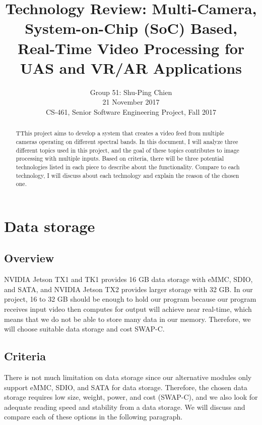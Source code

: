 \documentclass[letterpaper,10pt,serif,draftclsnofoot,onecolumn,compsoc,titlepage]{IEEEtran}
\title{Technology Review: Multi-Camera, System-on-Chip (SoC) Based, Real-Time Video Processing for UAS and VR/AR Applications}
\author{Group 51: Shu-Ping Chien \\ 21 November 2017 \\ CS-461, Senior Software Engineering Project, Fall 2017}
\begin{document}
\begin{titlepage}
\maketitle
\begin{abstract}

TThis project aims to develop a system that creates a video feed from multiple cameras operating on 
different spectral bands. In this document, I will analyze three different topics used in this project, 
and the goal of these topics contributes to image processing with multiple inputs. Based on criteria, 
there will be three potential technologies listed in each piece to describe about the functionality. 
Compare to each technology, I will discuss about each technology and explain the reason of the chosen one.


\end{abstract}
\end{titlepage}
\newpage

\tableofcontents
\newpage

\section{Data storage}
\subsection{Overview}
NVIDIA Jetson TX1 and TK1 provides 16 GB data storage with eMMC, SDIO, and SATA, and NVIDIA 
Jetson TX2 provides larger storage with 32 GB. In our project, 16 to 32 GB should be enough to 
hold our program because our program receives input video then computes for output will achieve 
near real-time, which means that we do not be able to store many data in our memory. Therefore, 
we will choose suitable data storage and cost SWAP-C. \\


\subsection{Criteria}
There is not much limitation on data storage since our alternative modules only support eMMC, SDIO, 
and SATA for data storage. Therefore, the chosen data storage requires low size, weight, power, and
 cost (SWAP-C), and we also look for adequate reading speed and stability from a data storage. We 
 will discuss and compare each of these options in the following paragraph. \\
\end{document}
